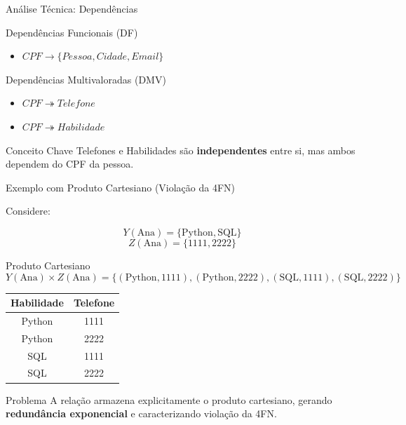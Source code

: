 \documentclass[9pt]{beamer}
\begin{document}
\begin{frame}{Análise Técnica: Dependências}
  \begin{block}{Dependências Funcionais (DF)}
    \begin{itemize}
      \item $CPF \to \{Pessoa, Cidade, Email\}$
    \end{itemize}
  \end{block}
  \vspace{0.3cm}
  \begin{block}{Dependências Multivaloradas (DMV)}
    \begin{itemize}
      \item $CPF \twoheadrightarrow Telefone$
      \item $CPF \twoheadrightarrow Habilidade$
    \end{itemize}
  \end{block}
  \vspace{0.3cm}
  \begin{exampleblock}{Conceito Chave}
    Telefones e Habilidades são \textbf{independentes} entre si, mas ambos dependem do CPF da pessoa.
  \end{exampleblock}
\end{frame}
\begin{frame}{Exemplo com Produto Cartesiano (Violação da 4FN)}
\small

Considere:

\[
Y(\text{Ana}) = \{\text{Python}, \text{SQL}\}
\]
\[
Z(\text{Ana}) = \{1111, 2222\}
\]

\vspace{0.3cm}

\begin{block}{Produto Cartesiano}
\[
Y(\text{Ana}) \times Z(\text{Ana}) =
\{
(\text{Python},1111),
(\text{Python},2222),
(\text{SQL},1111),
(\text{SQL},2222)
\}
\]
\end{block}

\vspace{0.3cm}

\centering
\begin{tabular}{|c|c|}
\hline
\textbf{Habilidade} & \textbf{Telefone} \\ \hline
Python & 1111 \\ \hline
Python & 2222 \\ \hline
SQL & 1111 \\ \hline
SQL & 2222 \\ \hline
\end{tabular}

\vspace{0.3cm}

\begin{alertblock}{Problema}
A relação armazena explicitamente o produto cartesiano, gerando
\textbf{redundância exponencial} e caracterizando violação da 4FN.
\end{alertblock}

\end{frame}
\end{document}
